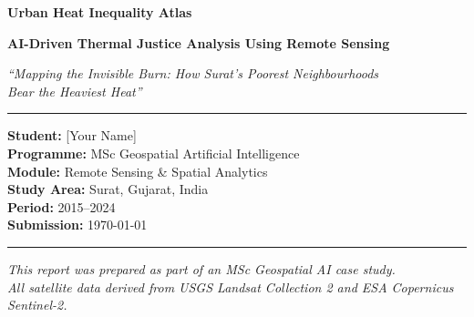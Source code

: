 \documentclass[12pt, a4paper]{article}
\begin{document}
\begin{titlepage}
\centering
\vspace*{2cm}

{\Huge\bfseries\color{accentred}
  Urban Heat Inequality Atlas
\par}

\vspace{0.5cm}
{\Large\bfseries
  AI-Driven Thermal Justice Analysis Using Remote Sensing
\par}

\vspace{1.5cm}
{\large\itshape
  ``Mapping the Invisible Burn: How Surat's Poorest Neighbourhoods\\
  Bear the Heaviest Heat''
\par}

\vspace{2cm}
\rule{0.6\textwidth}{0.5pt}

\vspace{0.5cm}
{\large
  \textbf{Student:} [Your Name]\\[4pt]
  \textbf{Programme:} MSc Geospatial Artificial Intelligence\\[4pt]
  \textbf{Module:} Remote Sensing \& Spatial Analytics\\[4pt]
  \textbf{Study Area:} Surat, Gujarat, India\\[4pt]
  \textbf{Period:} 2015--2024\\[4pt]
  \textbf{Submission:} \today
\par}

\vspace{2cm}
\rule{0.6\textwidth}{0.5pt}

\vfill
{\small
  \textit{This report was prepared as part of an MSc Geospatial AI case study.\\
  All satellite data derived from USGS Landsat Collection 2 and ESA Copernicus Sentinel-2.}
}
\end{titlepage}
\end{document}
